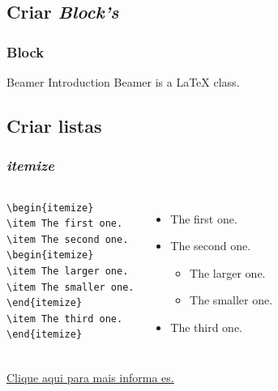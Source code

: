 \documentclass{article}
\begin{document}
\subsection{Criar \emph{Block's}}
\begin{frame}
\frametitle{Block}

\begin{block}{Beamer Introduction}
Beamer is a { \LaTeX} class.
\end{block}

\end{frame}

\subsection{Criar listas}
\begin{frame}[fragile]
\frametitle{\emph{itemize}}

\begin{columns}
\begin{block}
\scriptsize{
\begin{verbatim}
\begin{itemize}
\item The first one.
\item The second one.
\begin{itemize}
\item The larger one.
\item The smaller one.
\end{itemize}
\item The third one.
\end{itemize}
\end{verbatim}
}
\end{block}

\begin{itemize}
\item The first one.
\item The second one.
\begin{itemize}
\item The larger one.
\item The smaller one.
\end{itemize}
\item The third one.
\end{itemize}
\end{columns}
\vspace{1.5cm}
\href{https://tug.ctan.org/macros/latex/contrib/beamer/doc/beameruserguide.pdf}{Clique aqui para mais informa es.}
\end{frame}
\end{document}
